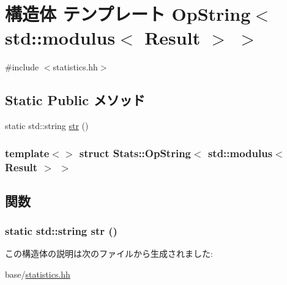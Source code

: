 \hypertarget{structStats_1_1OpString_3_01std_1_1modulus_3_01Result_01_4_01_4}{
\section{構造体 テンプレート OpString$<$ std::modulus$<$ Result $>$ $>$}
\label{structStats_1_1OpString_3_01std_1_1modulus_3_01Result_01_4_01_4}
}


{\ttfamily \#include $<$statistics.hh$>$}\subsection*{Static Public メソッド}
\begin{DoxyCompactItemize}
\item 
static std::string \hyperlink{structStats_1_1OpString_3_01std_1_1modulus_3_01Result_01_4_01_4_ac257b778f78be168137f5dc30893349b}{str} ()
\end{DoxyCompactItemize}
\subsubsection*{template$<$$>$ struct Stats::OpString$<$ std::modulus$<$ Result $>$ $>$}



\subsection{関数}
\hypertarget{structStats_1_1OpString_3_01std_1_1modulus_3_01Result_01_4_01_4_ac257b778f78be168137f5dc30893349b}{
\subsubsection[{str}]{\setlength{\rightskip}{0pt plus 5cm}static std::string str ()}}
\label{structStats_1_1OpString_3_01std_1_1modulus_3_01Result_01_4_01_4_ac257b778f78be168137f5dc30893349b}





この構造体の説明は次のファイルから生成されました:\begin{DoxyCompactItemize}
\item 
base/\hyperlink{statistics_8hh}{statistics.hh}\end{DoxyCompactItemize}
